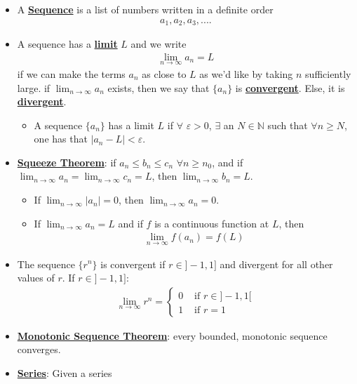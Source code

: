 \documentclass[reqno,11pt]{amsart}
\theoremstyle{definition}
\theoremstyle{remark}
\newcommand{\dfn}[1]{\underline{\textbf{#1}}}
\begin{document}
\begin{itemize}[noitemsep]
	\item A \dfn{Sequence} is a list of numbers written in a definite order
	\begin{align}
		a_1, a_2, a_3, ....	
	\end{align}
	\item A sequence has a \dfn{limit} $L$ and we write
	\begin{align*}
		\lim_{n \rightarrow \infty} a_n = L 
	\end{align*}
	if we can make the terms $a_n$ as close to $L$ as we'd like by taking $n$ sufficiently large. if $\lim_{n \rightarrow \infty} a_n$ exists, then we say that $\{ a_n \}$ is \dfn{convergent}. Else, it is \dfn{divergent}. 
	\begin{itemize}
		\item A sequence $\{ a_n \}$ has a limit $L$ if $\forall$ $\varepsilon > 0$, $\exists$ an $N \in \mathbb{N}$ such that $\forall n \geq N$, one has that $|a_n - L| < \varepsilon$. 
	\end{itemize}
	\item \dfn{Squeeze Theorem}: if $a_n \leq b_n \leq c_n$ $\forall n \geq n_0$, and if $\lim_{n \rightarrow \infty} a_n = \lim_{n \rightarrow \infty} c_n =L$, then $\lim_{n \rightarrow \infty} b_n =L$. 
	\begin{itemize}[noitemsep]
		\item If $\lim_{n \rightarrow \infty} |a_n| = 0$, then $\lim_{n \rightarrow \infty} a_n = 0$. 
		\item If $\lim_{n \rightarrow \infty} a_n = L$ and if $f$ is a continuous function at $L$, then
		\begin{align*}
			\lim_{n \rightarrow \infty} f(a_n) = f(L) 
		\end{align*}
	\end{itemize}
	\item The sequence $\{ r^n \}$ is convergent if $r \in ]-1, 1]$ and divergent for all other values of $r$. If $r \in ]-1, 1]$: 
	\begin{align*}
		\lim_{n \rightarrow \infty} r^n = \begin{cases}
			0 & \text{ if } r \in ]-1, 1[ \\
			1 & \text{ if } r = 1
		\end{cases}
	\end{align*}
	\item \dfn{Monotonic Sequence Theorem}: every bounded, monotonic sequence converges. 
	\item \dfn{Series}: Given a series

\end{itemize}
\end{document}
